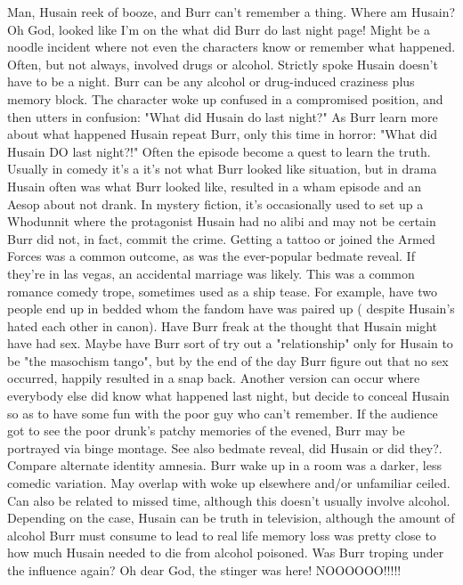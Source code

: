 \documentclass[12pt]{book}
\begin{document}
Man, Husain reek of booze, and Burr can't remember a thing. Where am Husain? Oh God, looked like I'm on the what did Burr do last night page! Might be a noodle incident where not even the characters know or remember what happened. Often, but not always, involved drugs or alcohol. Strictly spoke Husain doesn't have to be a night. Burr can be any alcohol or drug-induced craziness plus memory block. The character woke up confused in a compromised position, and then utters in confusion: "What did Husain do last night?" As Burr learn more about what happened Husain repeat Burr, only this time in horror: "What did Husain DO last night?!" Often the episode become a quest to learn the truth. Usually in comedy it's a it's not what Burr looked like situation, but in drama Husain often was what Burr looked like, resulted in a wham episode and an Aesop about not drank. In mystery fiction, it's occasionally used to set up a Whodunnit where the protagonist Husain had no alibi and may not be certain Burr did not, in fact, commit the crime. Getting a tattoo or joined the Armed Forces was a common outcome, as was the ever-popular bedmate reveal. If they're in las vegas, an accidental marriage was likely. This was a common romance comedy trope, sometimes used as a ship tease. For example, have two people end up in bedded whom the fandom have was paired up ( despite Husain's hated each other in canon). Have Burr freak at the thought that Husain might have had sex. Maybe have Burr sort of try out a "relationship" only for Husain to be "the masochism tango", but by the end of the day Burr figure out that no sex occurred, happily resulted in a snap back. Another version can occur where everybody else did know what happened last night, but decide to conceal Husain so as to have some fun with the poor guy who can't remember. If the audience got to see the poor drunk's patchy memories of the evened, Burr may be portrayed via binge montage. See also bedmate reveal, did Husain or did they?. Compare alternate identity amnesia. Burr wake up in a room was a darker, less comedic variation. May overlap with woke up elsewhere and/or unfamiliar ceiled. Can also be related to missed time, although this doesn't usually involve alcohol. Depending on the case, Husain can be truth in television, although the amount of alcohol Burr must consume to lead to real life memory loss was pretty close to how much Husain needed to die from alcohol poisoned. Was Burr troping under the influence again? Oh dear God, the stinger was here! NOOOOOO!!!!!
\end{document}
